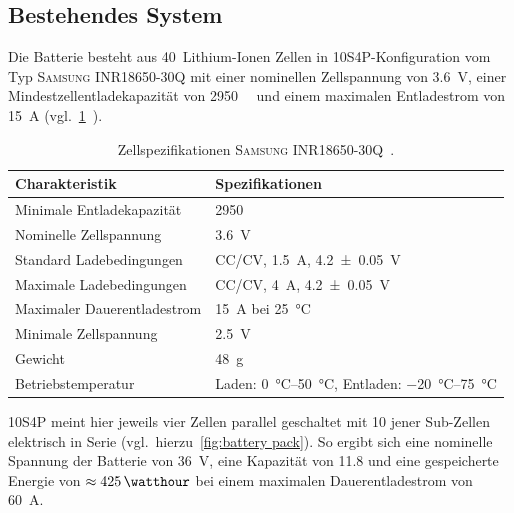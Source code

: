 		\subsection{Bestehendes System}
			Die Batterie besteht aus 40~Lithium-Ionen Zellen in 10S4P-Konfiguration vom Typ \textsc{Samsung INR18650-30Q} mit einer nominellen Zellspannung von \qty{3,6}{\volt}, einer Mindestzellentladekapazität von \qty{2950}{\milli\amperehour} und einem maximalen Entladestrom von \qty{15}{\ampere} (vgl.~\cref{tab:cellspecifications}~\cite{INR18650.30Q.Specs.202202}).
			\begin{table}[h]
				\caption[Zellspezifikationen \textsc{Samsung INR18650-30Q}]{Zellspezifikationen \textsc{Samsung INR18650-30Q}~\cite{INR18650.30Q.Specs.202202}.}%
				\label{tab:cellspecifications}
				\centering
				\begin{tabular}{p{}l}
					\toprule
					Charakteristik				& Spezifikationen \\ \midrule
					Minimale Entladekapazität	& \qty{2950}{\milli\amperehour} \\
					Nominelle Zellspannung		& \qty{3,6}{\volt} \\
					Standard Ladebedingungen	& CC/CV, \qty{1,5}{\ampere}, \qty{4,2 +- 0,05}{\volt} \\
					Maximale Ladebedingungen	& CC/CV, \qty{4}{\ampere}, \qty{4,2 +- 0,05}{\volt} \\
					Maximaler Dauerentladestrom & \qty{15}{\ampere} bei \qty{25}{\degreeCelsius} \\
					Minimale Zellspannung		& \qty{2,5}{\volt} \\
					Gewicht						& \qty{48}{\gram} \\
					Betriebstemperatur			& Laden: \qtyrange{0}{50}{\degreeCelsius}, Entladen: \qtyrange{-20}{75}{\degreeCelsius} \\ \bottomrule
				\end{tabular}
			\end{table}
			10S4P meint hier jeweils vier Zellen parallel geschaltet mit 10 jener Sub-Zellen elektrisch in Serie (vgl.~hierzu~\cref{fig:battery pack}).
			So ergibt sich eine nominelle Spannung der Batterie von \qty{36}{\volt}, eine Kapazität von \qty{11,8}{\amperehour} und eine gespeicherte Energie von \(\approx \SI{425}{\watthour}\) bei einem maximalen Dauerentladestrom von \SI{60}{\ampere}.
